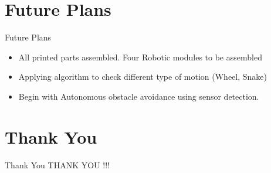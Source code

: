 \documentclass[10pt, a4paper]{beamer}
\begin{document}
\section{Future Plans}
\begin{frame}{Future Plans}
	\begin{itemize}
		\item All printed parts assembled. Four Robotic modules to be assembled
		\item Applying algorithm to check different type of motion (Wheel, Snake)

		\item  Begin with Autonomous obstacle avoidance using sensor detection.

	\end{itemize}
\end{frame}


\section{Thank You}
\begin{frame}{Thank You}
	\centering THANK YOU !!!
\end{frame}
\end{document}
